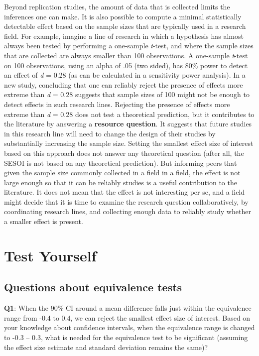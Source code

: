 \documentclass[
  oneside]{book}
\begin{document}
Beyond replication studies, the amount of data that is collected limits the inferences one can make. It is also possible to compute a minimal statistically detectable effect based on the sample sizes that are typically used in a research field. For example, imagine a line of research in which a hypothesis has almost always
been tested by performing a one-sample \emph{t}-test, and where the sample sizes that are collected are always smaller than 100 observations. A one-sample \emph{t}-test on 100 observations, using an alpha of .05 (two sided), has 80\% power to detect an effect of \emph{d} = 0.28 (as can be calculated in a sensitivity power analysis). In a new study, concluding that one can reliably reject the presence of effects more extreme than \emph{d} = 0.28 suggests that sample sizes of 100 might not be enough to detect effects in such research lines. Rejecting the presence of effects more extreme than \emph{d} = 0.28 does not test a theoretical prediction, but it contributes to the literature by answering a \textbf{resource question}. It suggests that future studies in this research line will need to change the design of their studies by substantially increasing the sample size. Setting the smallest effect size of interest based on this approach does not answer any theoretical question (after all, the SESOI is not based on any
theoretical prediction). But informing peers that given the sample size commonly collected in a field in a field, the effect is not large enough so that it can be reliably studies is a useful contribution to the literature. It does not mean that the effect is not interesting per se, and a field might decide that it is time to examine the research question collaboratively, by coordinating research lines, and collecting enough data to reliably study whether a smaller effect is present.

\hypertarget{test-yourself-7}{%
\section{Test Yourself}\label{test-yourself-7}}

\hypertarget{questions-about-equivalence-tests}{%
\subsection{Questions about equivalence tests}\label{questions-about-equivalence-tests}}

\textbf{Q1}: When the 90\% CI around a mean difference falls just within the equivalence range from -0.4 to 0.4, we can reject the smallest effect size of interest. Based on your knowledge about confidence intervals, when the equivalence range is changed to -0.3 -- 0.3, what is needed for the equivalence test to be significant (assuming the effect size estimate and standard deviation remains the same)?
\end{document}
